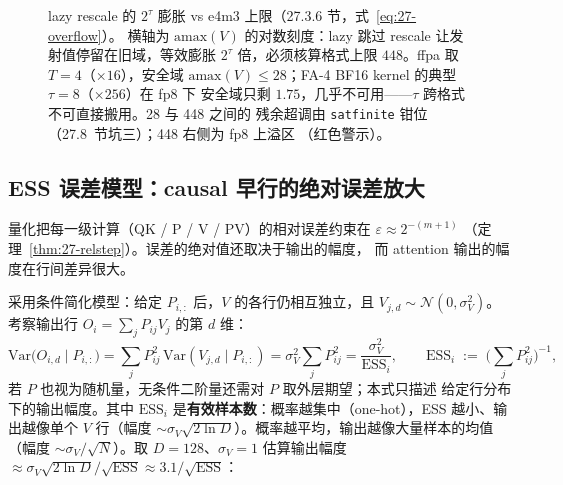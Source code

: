 \begin{figure}[H]
\caption{lazy rescale 的 $2^{\tau}$ 膨胀 vs e4m3 上限（27.3.6 节，式~\eqref{eq:27-overflow}）。
横轴为 $\mathrm{amax}(V)$ 的对数刻度：lazy 跳过 rescale 让发射值停留在旧域，等效膨胀
$2^{\tau}$ 倍，必须核算格式上限 $448$。ffpa 取 $T=4$（$\times16$），安全域
$\mathrm{amax}(V)\le 28$；FA-4 BF16 kernel 的典型 $\tau=8$（$\times256$）在 fp8 下
安全域只剩 $1.75$，几乎不可用——$\tau$ 跨格式不可直接搬用。28 与 448 之间的
残余超调由 \texttt{satfinite} 钳位（27.8~节坑三）；448 右侧为 fp8 上溢区
（红色警示）。}
\label{fig:27-lazy-rescale}
\end{figure}

\subsection{ESS 误差模型：causal 早行的绝对误差放大}

量化把每一级计算（QK / P / V / PV）的相对误差约束在 $\varepsilon \approx 2^{-(m+1)}$
（定理~\ref{thm:27-relstep}）。误差的绝对值还取决于输出的幅度，
而 attention 输出的幅度在行间差异很大。

采用条件简化模型：给定 $P_{i,:}$ 后，$V$ 的各行仍相互独立，且
$V_{j,d}\sim\mathcal{N}(0,\sigma_V^2)$。考察输出行
$O_i = \sum_j P_{ij} V_j$ 的第 $d$ 维：
\begin{equation}
  \mathrm{Var}\big(O_{i,d}\mid P_{i,:}\big)
  = \sum_j P_{ij}^2\, \mathrm{Var}(V_{j,d}\mid P_{i,:})
  = \sigma_V^2 \sum_j P_{ij}^2
  = \frac{\sigma_V^2}{\mathrm{ESS}_i},
  \qquad
  \mathrm{ESS}_i \;\mathrel{:=}\; \Big(\sum_j P_{ij}^2\Big)^{-1},
  \label{eq:27-ess}
\end{equation}
若 $P$ 也视为随机量，无条件二阶量还需对 $P$ 取外层期望；本式只描述
给定行分布下的输出幅度。其中 $\mathrm{ESS}_i$ 是\textbf{有效样本数}：概率越集中（one-hot），ESS 越小、输出越像单个
$V$ 行（幅度 $\sim \sigma_V\sqrt{2\ln D}$）。概率越平均，输出越像大量样本的均值
（幅度 $\sim \sigma_V / \sqrt{N}$）。取 $D{=}128$、$\sigma_V{=}1$ 估算输出幅度
$\approx \sigma_V \sqrt{2 \ln D} / \sqrt{\mathrm{ESS}} \approx 3.1/\sqrt{\mathrm{ESS}}$：

